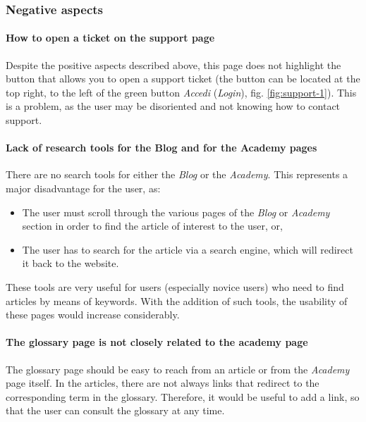 \subsubsection{Negative aspects}

\paragraph{How to open a ticket on the support page}

Despite the positive aspects described above, this page does not highlight 
the button that allows you to open a support ticket (the button can be 
located at the top right, to the left of the green button \textit{Accedi} 
(\textit{Login}), fig. \ref{fig:support-1}). This is a problem, as the 
user may be disoriented and not knowing how to contact support.

\paragraph{Lack of research tools for the Blog and for the Academy pages}

There are no search tools for either the \textit{Blog} or the 
\textit{Academy}. This represents a major disadvantage for the user, as:
\begin{itemize}
  \item The user must scroll through the various pages of the \textit{Blog} 
  or \textit{Academy} section in order to find the article of interest to 
  the user, or,

  \item The user has to search for the article via a search engine, which 
  will redirect it back to the website.
\end{itemize}
These tools are very useful for users (especially novice users) who need 
to find articles by means of keywords. With the addition of such tools, 
the usability of these pages would increase considerably.

\paragraph{The glossary page is not closely related to the academy page}

The glossary page should be easy to reach from an article or from the 
\textit{Academy} page itself. In the articles, there are not always links 
that redirect to the corresponding term in the glossary. Therefore, it 
would be useful to add a link, so that the user can consult the glossary 
at any time.

